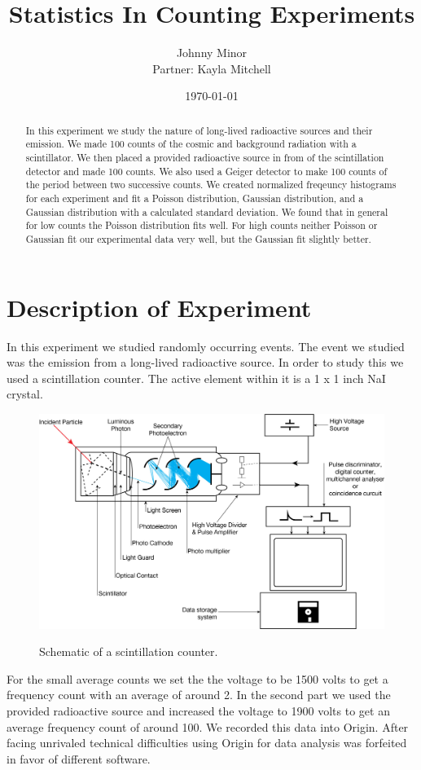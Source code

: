 \documentclass[12pt letterpaper]{article}
\title{Statistics In Counting Experiments}
\author{Johnny Minor \\ Partner: Kayla Mitchell}
\date{\today}
\begin{document}
\maketitle

\begin{abstract}
In this experiment we study the nature of long-lived radioactive sources and their emission. We made 100 counts of the cosmic and background radiation with a scintillator. We then placed a provided radioactive source in from of the scintillation detector and made 100 counts. We also used a Geiger detector to make 100 counts of the period between two successive counts. We created normalized freqeuncy histograms for each experiment and fit a Poisson distribution, Gaussian distribution, and a Gaussian distribution with a calculated standard deviation. We found that in general for low counts the Poisson distribution fits well. For high counts neither Poisson or Gaussian fit our experimental data very well, but the Gaussian fit slightly better. 
\end{abstract}

\newpage

\section*{Description of Experiment}

In this experiment we studied randomly occurring events. The event we studied was the emission from a long-lived radioactive source. In order to study this we used a scintillation counter. The active element within it is a 1 x 1 inch NaI crystal. 

\begin{figure}[H]
  \caption{Schematic of a scintillation counter.}
  \centering
    \includegraphics[width=.5\textwidth]{scintillation.jpg}
    \label{fig:scintillator}
\end{figure}

For the small average counts we set the the voltage to be 1500 volts to get a frequency count with an average of around 2. In the second part we used the provided radioactive source and increased the voltage to 1900 volts to get an average frequency count of around 100. We recorded this data into Origin. After facing unrivaled technical difficulties using Origin for data analysis was forfeited in favor of different software. 
\end{document}
